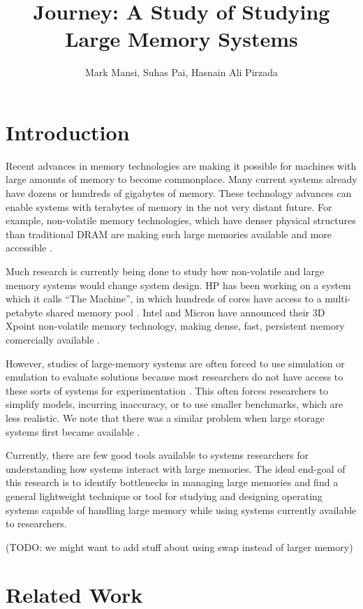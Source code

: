 \documentclass[twocolumn,11pt]{article}
\title{Journey: A Study of Studying Large Memory Systems}
\author{Mark Mansi, Suhas Pai, Hasnain Ali Pirzada}
\date{}
\begin{document}
\maketitle

\section{Introduction}

Recent advances in memory technologies are making it possible for machines with
large amounts of memory to become commonplace. Many current systems already
have dozens or hundreds of gigabytes of memory. These technology advances can
enable systems with terabytes of memory in the not very distant future. For
example, non-volatile memory technologies, which have denser physical
structures than traditional DRAM are making such large memories available and
more accessible \cite{xpoint}.

Much research is currently being done to study how non-volatile and large
memory systems would change system design. HP has been working on a system
which it calls ``The Machine'', in which hundreds of cores have access to a
multi-petabyte shared memory pool \cite{hp_machine}. Intel and
Micron have announced their 3D Xpoint non-volatile memory technology, making
dense, fast, persistent memory comercially available \cite{xpoint}.

However, studies of large-memory systems are often forced to use simulation or
emulation to evaluate solutions because most researchers do not have access to
these sorts of systems for experimentation \cite{quartz}. This often
forces researchers to simplify models, incurring inaccuracy, or to use smaller
benchmarks, which are less realistic. We note that there was a similar problem
when large storage systems first became available \cite{david, exalt}.

Currently, there are few good tools available to systems researchers for
understanding how systems interact with large memories. The ideal end-goal of
this research is to identify bottlenecks in managing large memories and find a
general lightweight technique or tool for studying and designing operating
systems capable of handling large memory while using systems currently
available to researchers.

(TODO: we might want to add stuff about using swap instead of larger memory)

\section{Related Work}
\end{document}
